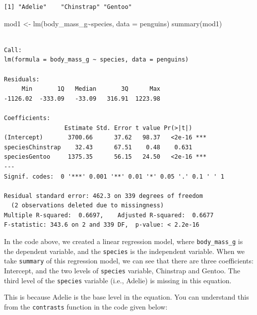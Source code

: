 \documentclass[
  letterpaper,
  paper =a4,
  twoside,
  openright,
  headsepline,
  footsepline,
  listof = totocnumbered,
  chapterprefix = true,
  firstiscover,
  parskip = full*]{scrbook}
\newenvironment{Shaded}{\begin{snugshade}}{\end{snugshade}}
\newcommand{\AttributeTok}[1]{\textcolor[rgb]{0.40,0.45,0.13}{#1}}
\newcommand{\FunctionTok}[1]{\textcolor[rgb]{0.28,0.35,0.67}{#1}}
\newcommand{\NormalTok}[1]{\textcolor[rgb]{0.00,0.23,0.31}{#1}}
\newcommand{\OtherTok}[1]{\textcolor[rgb]{0.00,0.23,0.31}{#1}}
\newcommand{\SpecialCharTok}[1]{\textcolor[rgb]{0.37,0.37,0.37}{#1}}
\begin{document}
\begin{verbatim}
[1] "Adelie"    "Chinstrap" "Gentoo"   
\end{verbatim}

\begin{Shaded}
\begin{Highlighting}[]
\NormalTok{mod1 }\OtherTok{\textless{}{-}} \FunctionTok{lm}\NormalTok{(body\_mass\_g}\SpecialCharTok{\textasciitilde{}}\NormalTok{species, }\AttributeTok{data =}\NormalTok{ penguins)}
\FunctionTok{summary}\NormalTok{(mod1)}
\end{Highlighting}
\end{Shaded}

\begin{verbatim}

Call:
lm(formula = body_mass_g ~ species, data = penguins)

Residuals:
     Min       1Q   Median       3Q      Max 
-1126.02  -333.09   -33.09   316.91  1223.98 

Coefficients:
                 Estimate Std. Error t value Pr(>|t|)    
(Intercept)       3700.66      37.62   98.37   <2e-16 ***
speciesChinstrap    32.43      67.51    0.48    0.631    
speciesGentoo     1375.35      56.15   24.50   <2e-16 ***
---
Signif. codes:  0 '***' 0.001 '**' 0.01 '*' 0.05 '.' 0.1 ' ' 1

Residual standard error: 462.3 on 339 degrees of freedom
  (2 observations deleted due to missingness)
Multiple R-squared:  0.6697,    Adjusted R-squared:  0.6677 
F-statistic: 343.6 on 2 and 339 DF,  p-value: < 2.2e-16
\end{verbatim}

In the code above, we created a linear regression model, where
\texttt{body\_mass\_g} is the dependent variable, and the
\texttt{species} is the independent variable. When we take
\texttt{summary} of this regression model, we can see that there are
three coefficients: Intercept, and the two levels of \texttt{species}
variable, Chinstrap and Gentoo. The third level of the \texttt{species}
variable (i.e., Adelie) is missing in this equation.

This is because Adelie is the base level in the equation. You can
understand this from the \texttt{contrasts} function in the code given
below:

\begin{Shaded}
\end{Shaded}
\end{document}
